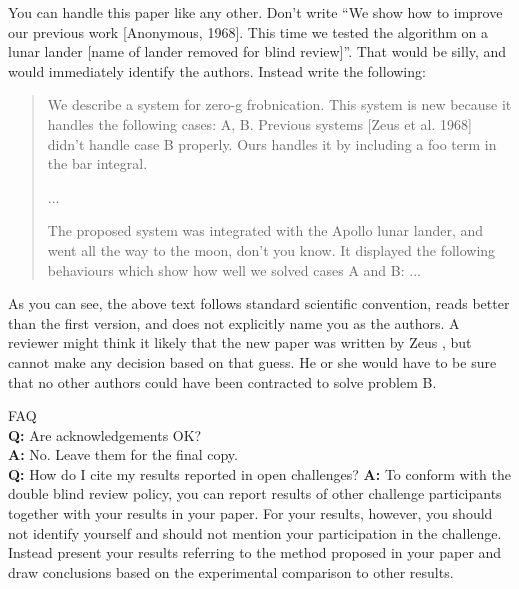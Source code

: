 \documentclass[10pt,twocolumn,letterpaper]{article}
\begin{document}
\begin{CJK}{UTF8}{bkai}
   You can handle this paper like any other.  Don't write ``We show how to
   improve our previous work [Anonymous, 1968].  This time we tested the
   algorithm on a lunar lander [name of lander removed for blind review]''.
   That would be silly, and would immediately identify the authors. Instead
   write the following:
   \begin{quotation}
      \noindent
      We describe a system for zero-g frobnication.  This
      system is new because it handles the following cases:
      A, B.  Previous systems [Zeus et al. 1968] didn't
      handle case B properly.  Ours handles it by including
      a foo term in the bar integral.

      ...

      The proposed system was integrated with the Apollo
      lunar lander, and went all the way to the moon, don't
      you know.  It displayed the following behaviours
      which show how well we solved cases A and B: ...
   \end{quotation}
   As you can see, the above text follows standard scientific convention,
   reads better than the first version, and does not explicitly name you as
   the authors.  A reviewer might think it likely that the new paper was
   written by Zeus \etal, but cannot make any decision based on that guess.
   He or she would have to be sure that no other authors could have been
   contracted to solve problem B.
   \medskip

   \noindent
   FAQ\medskip\\
   {\bf Q:} Are acknowledgements OK?\\
   {\bf A:} No.  Leave them for the final copy.\medskip\\
   {\bf Q:} How do I cite my results reported in open challenges?
   {\bf A:} To conform with the double blind review policy, you can report results of other challenge participants together with your results in your paper. For your results, however, you should not identify yourself and should not mention your participation in the challenge. Instead present your results referring to the method proposed in your paper and draw conclusions based on the experimental comparison to other results.\medskip\\


\end{CJK}
\end{document}
